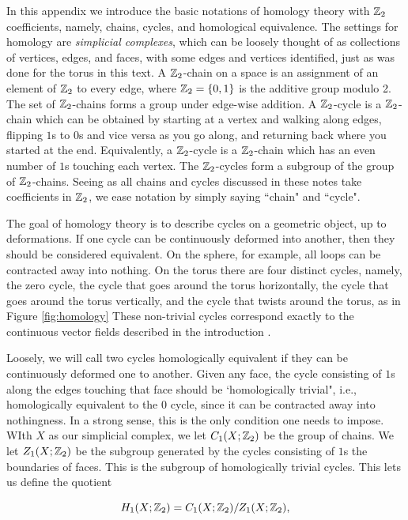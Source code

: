 \documentclass{article}
\theoremstyle{definition}
\numberwithin{figure}{section}
\begin{document}
In this appendix we introduce the basic notations of homology theory with $\mathbb{Z}_2$ coefficients, namely, chains, cycles, and homological equivalence. The settings for homology are \textit{simplicial complexes}, which can be loosely thought of as collections of vertices, edges, and faces, with some edges and vertices identified, just as was done for the torus in this text. A $\mathbb{Z}_2$-chain on a space is an assignment of an element of $\mathbb{Z}_2$ to every edge, where $\mathbb{Z}_2=\{0,1\}$ is the additive group modulo 2. The set of $\mathbb{Z}_2$-chains forms a group under edge-wise addition. A $\mathbb{Z}_2$-cycle is a $\mathbb{Z}_2$-chain which can be obtained by starting at a vertex and walking along edges, flipping $1$s to $0$s and vice versa as you go along, and returning back where you started at the end. Equivalently, a $\mathbb{Z}_2$-cycle is a $\mathbb{Z}_2$-chain which has an even number of $1$s touching each vertex. The $\mathbb{Z}_2$-cycles form a subgroup of the group of $\mathbb{Z}_2$-chains. Seeing as all chains and cycles discussed in these notes take coefficients in $\mathbb{Z}_2$, we ease notation by simply saying ``chain" and ``cycle".

The goal of homology theory is to describe cycles on a geometric object, up to deformations. If one cycle can be continuously deformed into another, then they should be considered equivalent. On the sphere, for example, all loops can be contracted away into nothing. On the torus there are four distinct cycles, namely, the zero cycle, the cycle that goes around the torus horizontally, the cycle that goes around the torus vertically, and the cycle that twists around the torus, as in Figure \ref{fig:homology} These non-trivial cycles correspond exactly to the continuous vector fields described in the introduction \cite{frankel1957homology}.

Loosely, we will call two cycles homologically equivalent if they can be continuously deformed one to another. Given any face, the cycle consisting of $1$s along the edges touching that face should be `homologically trivial", i.e., homologically equivalent to the $0$ cycle, since it can be contracted away into nothingness. In a strong sense, this is the only condition one needs to impose. WIth $X$ as our simplicial complex, we let $C_1(X;\mathbb{Z}_2)$ be the group of chains. We let $Z_1(X;\mathbb{Z}_2)$ be the subgroup generated by the cycles consisting of $1$s  the boundaries of faces. This is the subgroup of homologically trivial cycles. This lets us define the quotient

$$H_1(X;\mathbb{Z}_2)=C_1(X;\mathbb{Z}_2)/Z_1(X;\mathbb{Z}_2),$$
\end{document}
